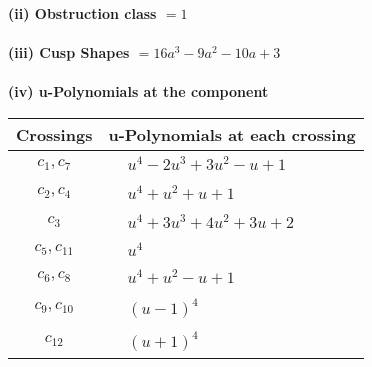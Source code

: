 \documentclass[1p]{elsarticle_modified}
\theoremstyle{definition}
\begin{document}
\flushleft \textbf{(ii) Obstruction class $= 1$}\\~\\
\flushleft \textbf{(iii) Cusp Shapes $= 16 a^3-9 a^2-10 a+3$}\\~\\
\newpage\renewcommand{\arraystretch}{1}
\flushleft \textbf{(iv) u-Polynomials at the component}\newline \\
\begin{tabular}{m{50pt}|m{274pt}}
Crossings & \hspace{64pt}u-Polynomials at each crossing \\
\hline $$\begin{aligned}c_{1},c_{7}\end{aligned}$$&$\begin{aligned}
&u^4-2 u^3+3 u^2- u+1
\end{aligned}$\\
\hline $$\begin{aligned}c_{2},c_{4}\end{aligned}$$&$\begin{aligned}
&u^4+u^2+u+1
\end{aligned}$\\
\hline $$\begin{aligned}c_{3}\end{aligned}$$&$\begin{aligned}
&u^4+3 u^3+4 u^2+3 u+2
\end{aligned}$\\
\hline $$\begin{aligned}c_{5},c_{11}\end{aligned}$$&$\begin{aligned}
&u^4
\end{aligned}$\\
\hline $$\begin{aligned}c_{6},c_{8}\end{aligned}$$&$\begin{aligned}
&u^4+u^2- u+1
\end{aligned}$\\
\hline $$\begin{aligned}c_{9},c_{10}\end{aligned}$$&$\begin{aligned}
&(u-1)^4
\end{aligned}$\\
\hline $$\begin{aligned}c_{12}\end{aligned}$$&$\begin{aligned}
&(u+1)^4
\end{aligned}$\\
\hline
\end{tabular}\\~\\
\end{document}
